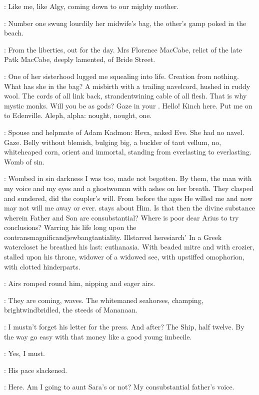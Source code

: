 \StephenInt:
Like me, like Algy,
coming down to our mighty mother.

:
Number one swung lourdily her midwife's bag,
the other's gamp poked in the beach.

:
From the liberties, out for the day.
Mrs Florence MacCabe,
relict of the late Patk MacCabe, deeply lamented,
of Bride Street.

\StephenInt:
One of her sisterhood lugged me squealing into life.
Creation from nothing.
What has she in the bag?
A misbirth with a trailing navelcord,
hushed in ruddy wool.
The cords of all link back,
strandentwining cable of all flesh.
That is why mystic monks.
Will you be as gods?
Gaze in your
.
Hello!
Kinch here.
Put me on to Edenville.
Aleph, alpha:
nought, nought, one.

\StephenInt:
Spouse and helpmate of Adam Kadmon:
Heva, naked Eve.
She had no navel.
Gaze.
Belly without blemish, bulging big,
a buckler of taut vellum,
no, whiteheaped corn,
orient and immortal,
standing from everlasting to everlasting.
Womb of sin.

\StephenInt:
Wombed in sin darkness I was too, made not begotten.
By them, the man with my voice and my eyes
and a ghostwoman with ashes on her breath.
They clasped and sundered, did the coupler's will.
From before the ages
He willed me
and now may not will me away or ever.
 stays about Him.
Is that then the divine substance wherein Father and Son are consubstantial?
Where is poor dear Arius to try conclusions?
Warring his life long upon the contransmagnificandjewbangtantiality.
Illstarred heresiarch'
In a Greek watercloset he breathed his last:
euthanasia.
With beaded mitre and with crozier,
stalled upon his throne,
widower of a widowed see,
with upstiffed omophorion,
with clotted hinderparts.

:
Airs romped round him, nipping and eager airs.

\StephenInt:
They are coming,
waves.
The whitemaned seahorses, champing,
brightwindbridled,
the steeds of Mananaan.

\StephenInt:
I mustn't forget his letter for the press.
And after?
The Ship, half twelve.
By the way
go easy with that money like a good young imbecile.

\StephenInt:
Yes, I must.

:
His pace slackened.

\StephenInt:
Here.
Am I going to aunt Sara's or not?
My consubstantial father's voice.

